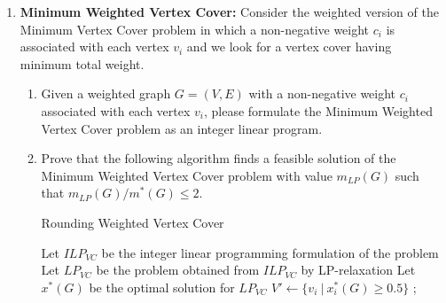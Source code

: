 \documentclass[12pt,a4paper]{article}
\theoremstyle{definition}
\begin{document}
\begin{enumerate}
    \item
    \textbf{Minimum Weighted Vertex Cover:} Consider the weighted version of the Minimum Vertex Cover problem in which a non-negative weight $c_i$ is associated with each vertex $v_i$ and we look for a vertex cover having minimum total weight.

    \begin{enumerate}
        \item
        Given a weighted graph $G=(V, E)$ with a non-negative weight $c_i$ associated with each vertex $v_i$, please formulate the Minimum Weighted Vertex Cover problem as an integer linear program.

        \item
        Prove that the following algorithm finds a feasible solution of the Minimum Weighted Vertex Cover problem with value $m_{LP}(G)$ such that $m_{LP}(G)/m^*(G) \leq 2$.

        \begin{minipage}{0.8\textwidth}
        \centering
        \begin{algorithm}[H]
        \caption{Rounding Weighted Vertex Cover}
        \BlankLine
        Let $ILP_{VC}$ be the integer linear programming formulation of the problem\;
        Let $LP_{VC}$ be the problem obtained from $ILP_{VC}$ by LP-relaxation\;
        Let $x^*(G)$ be the optimal solution for $LP_{VC}$\;
        $V' \leftarrow \{v_i \ | \ x_i^*(G) \geq 0.5\}$\;
        ;
        \end{algorithm}
        \end{minipage}

    \end{enumerate}


\end{enumerate}
\end{document}
